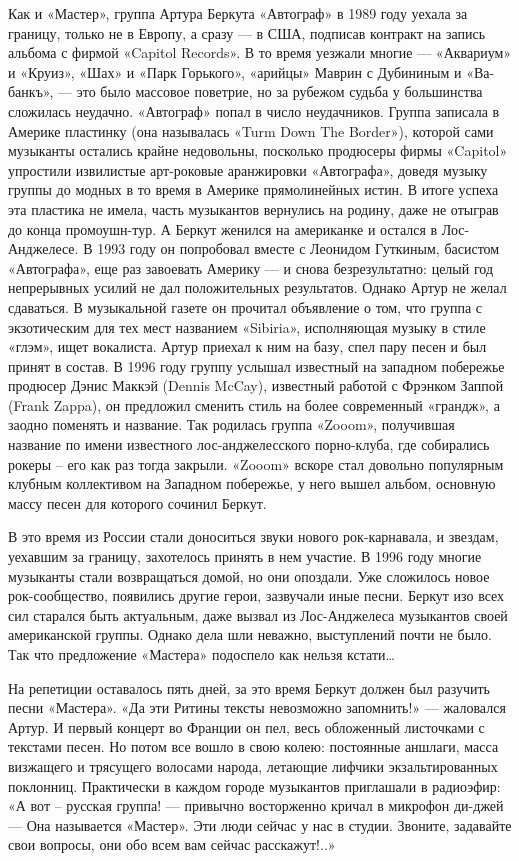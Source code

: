 \documentclass[16pt,a5paper,oneside]{book}
\begin{document}
Как и «Мастер», группа Артура Беркута «Автограф» в 1989 году уехала за границу, только не в Европу, а сразу — в США,
подписав контракт на запись альбома с фирмой «Capitol Records». В то время уезжали многие — «Аквариум» и «Круиз», «Шах»
и «Парк Горького», «арийцы» Маврин с Дубининым и «Ва-банкъ», — это было массовое поветрие, но за рубежом судьба у
большинства сложилась неудачно. «Автограф» попал в число неудачников. Группа записала в Америке пластинку (она
называлась «Turm Down The Border»), которой сами музыканты остались крайне недовольны, посколько продюсеры фирмы
«Capitol» упростили извилистые арт-роковые аранжировки «Автографа», доведя музыку группы до модных в то время в Америке
прямолинейных истин. В итоге успеха эта пластика не имела, часть музыкантов вернулись на родину, даже не отыграв до
конца промоушн-тур. А Беркут женился на американке и остался в Лос-Анджелесе. В 1993 году он попробовал вместе с
Леонидом Гуткиным, басистом «Автографа», еще раз завоевать Америку — и снова безрезультатно: целый год непрерывных
усилий не дал положительных результатов. Однако Артур не желал сдаваться. В музыкальной газете он прочитал объявление о
том, что группа с экзотическим для тех мест названием «Sibiria», исполняющая музыку в стиле «глэм», ищет вокалиста.
Артур приехал к ним на базу, спел пару песен и был принят в состав. В 1996 году группу услышал известный на западном
побережье продюсер Дэнис Маккэй (Dennis McCay), известный работой с Фрэнком Заппой (Frank Zappa), он предложил сменить
стиль на более современный «грандж», а заодно поменять и название. Так родилась группа «Zooom», получившая название по
имени известного лос-анджелесского порно-клуба, где собирались рокеры – его как раз тогда закрыли. «Zooom» вскоре стал
довольно популярным клубным коллективом на Западном побережье, у него вышел альбом, основную массу песен для которого
сочинил Беркут.

В это время из России стали доноситься звуки нового рок-карнавала, и звездам, уехавшим за границу, захотелось принять в
нем участие. В 1996 году многие музыканты стали возвращаться домой, но они опоздали. Уже сложилось новое рок-сообщество,
появились другие герои, зазвучали иные песни. Беркут изо всех сил старался быть актуальным, даже вызвал из Лос-Анджелеса
музыкантов своей американской группы. Однако дела шли неважно, выступлений почти не было. Так что предложение «Мастера»
подоспело как нельзя кстати\ldots

На репетиции оставалось пять дней, за это время Беркут должен был разучить песни «Мастера». «Да эти Ритины тексты
невозможно запомнить!» — жаловался Артур. И первый концерт во Франции он пел, весь обложенный листочками с текстами
песен. Но потом все вошло в свою колею: постоянные аншлаги, масса визжащего и трясущего волосами народа, летающие
лифчики экзальтированных поклонниц. Практически в каждом городе музыкантов приглашали в радиоэфир: «А вот – русская
группа! — привычно восторженно кричал в микрофон ди-джей — Она называется «Мастер». Эти люди сейчас у нас в студии.
Звоните, задавайте свои вопросы, они обо всем вам сейчас расскажут!..»
\end{document}
